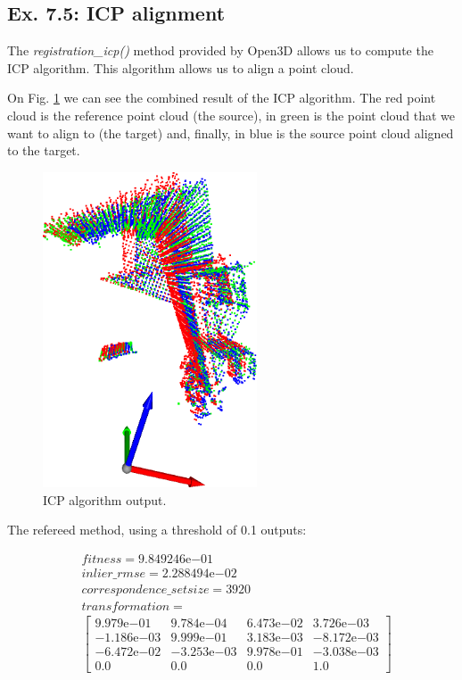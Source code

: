 \documentclass[journal]{IEEEtran}
\begin{document}
\subsection{Ex. 7.5: ICP alignment}

The \emph{registration\_icp()} method provided by Open3D allows us to compute the ICP algorithm. This algorithm allows us to align a point cloud.

On Fig. \ref{fig:7.5_icp} we can see the combined result of the ICP algorithm. The red point cloud is the reference point cloud (the source), in green is the point cloud that we want to align to (the target) and, finally, in blue is the source point cloud aligned to the target.

\begin{figure}[htp]
  \centering
  \includegraphics[width=2.5in]{imgs/7.5_icp.png}
  \caption{ICP algorithm output.}
  \label{fig:7.5_icp}
\end{figure}
\FloatBarrier

The refereed method, using a threshold of 0.1 outputs:

\begin{align*}
  &fitness = 9.849246\mathrm{e}{-01} \\
  &inlier\_rmse = 2.288494\mathrm{e}{-02} \\
  &correspondence\_set size = 3920 \\
  &transformation = \\
  &\begin{bmatrix}
    9.979\mathrm{e}{-01} & 9.784\mathrm{e}{-04} & 6.473\mathrm{e}{-02} & 3.726\mathrm{e}{-03} \\
    -1.186\mathrm{e}{-03} & 9.999\mathrm{e}{-01} & 3.183\mathrm{e}{-03} & -8.172\mathrm{e}{-03} \\
    -6.472\mathrm{e}{-02} & -3.253\mathrm{e}{-03} & 9.978\mathrm{e}{-01} & -3.038\mathrm{e}{-03} \\
    0.0 & 0.0 & 0.0 & 1.0
  \end{bmatrix}
\end{align*}
\end{document}

